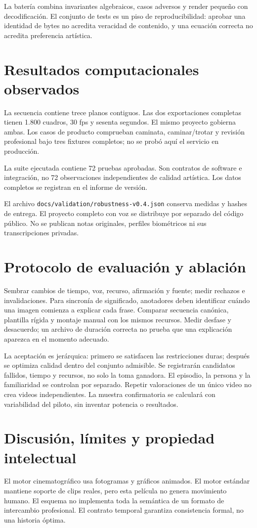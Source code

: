 \documentclass[10pt,a4paper]{article}
\begin{document}
La batería combina invariantes algebraicos, casos adversos y render pequeño con decodificación. El conjunto de tests es un piso de reproducibilidad: aprobar una identidad de bytes no acredita veracidad de contenido, y una ecuación correcta no acredita preferencia artística.
\section{Resultados computacionales observados}
La secuencia contiene trece planos contiguos. Las dos exportaciones completas tienen 1.800 cuadros, 30 fps y sesenta segundos. El mismo proyecto gobierna ambas. Los casos de producto comprueban caminata, caminar/trotar y revisión profesional bajo tres fixtures completos; no se probó aquí el servicio en producción.

La suite ejecutada contiene 72 pruebas aprobadas. Son contratos de software e integración, no 72 observaciones independientes de calidad artística. Los datos completos se registran en el informe de versión.

El archivo \texttt{docs/validation/robustness-v0.4.json} conserva medidas y hashes de entrega. El proyecto completo con voz se distribuye por separado del código público. No se publican notas originales, perfiles biométricos ni sus transcripciones privadas.
\section{Protocolo de evaluación y ablación}
Sembrar cambios de tiempo, voz, recurso, afirmación y fuente; medir rechazos e invalidaciones. Para sincronía de significado, anotadores deben identificar cuándo una imagen comienza a explicar cada frase. Comparar secuencia canónica, plantilla rígida y montaje manual con los mismos recursos. Medir desfase y desacuerdo; un archivo de duración correcta no prueba que una explicación aparezca en el momento adecuado.

La aceptación es jerárquica: primero se satisfacen las restricciones duras; después se optimiza calidad dentro del conjunto admisible. Se registrarán candidatos fallidos, tiempo y recursos, no solo la toma ganadora. El episodio, la persona y la familiaridad se controlan por separado. Repetir valoraciones de un único video no crea videos independientes. La muestra confirmatoria se calculará con variabilidad del piloto, sin inventar potencia o resultados.
\section{Discusión, límites y propiedad intelectual}
El motor cinematográfico usa fotogramas y gráficos animados. El motor estándar mantiene soporte de clips reales, pero esta película no genera movimiento humano. El esquema no implementa toda la semántica de un formato de intercambio profesional. El contrato temporal garantiza consistencia formal, no una historia óptima.
\end{document}
